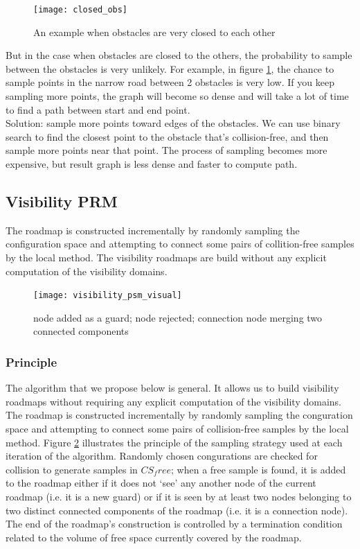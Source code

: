 \documentclass[11pt]{article}
\begin{document}
\begin{figure}
\texttt{[image: closed\_obs]}
\centering
\caption{An example when obstacles are very closed to each other}
\label{fig:closed_obs}
\end{figure}

But in the case when obstacles are closed to the others, the probability to sample between the obstacles is very unlikely. For example, in figure \ref{fig:closed_obs}, the chance to sample points in the narrow road between 2 obstacles is very low. If you keep sampling more points, the graph will become so dense and will take a lot of time to find a path between start and end point.\\
Solution: sample more points toward edges of the obstacles. We can use binary search to find the closest point to the obstacle that's collision-free, and then sample more points near that point. The process of sampling becomes more expensive, but result graph is less dense and faster to compute path.

\subsection{Visibility PRM}
The roadmap is constructed incrementally by randomly sampling the configuration space and attempting to connect some pairs of collition-free samples by the local method.
The visibility roadmaps are build without any explicit computation of the visibility domains.
\begin{figure}[h]
\texttt{[image: visibility\_psm\_visual]}
\centering
\caption{node added as a guard; node rejected; connection node merging two connected components}
\label{fig:vispsm_visual}
\end{figure}

\subsubsection{Principle}
The algorithm that we propose below is general. It allows us to build visibility
roadmaps without requiring any explicit computation of the visibility domains.
The roadmap is constructed incrementally by randomly sampling the conguration
space and attempting to connect some pairs of collision-free samples by the
local method. Figure \ref{fig:vispsm_visual} illustrates the principle of the sampling strategy used at
each iteration of the algorithm. Randomly chosen congurations are checked for
collision to generate samples in $CS_free$; when a free sample is found, it is added to
the roadmap either if it does not ‘see’ any another node of the current roadmap (i.e.
it is a new guard) or if it is seen by at least two nodes belonging to two distinct
connected components of the roadmap (i.e. it is a connection node). The end of
the roadmap’s construction is controlled by a termination condition related to the
volume of free space currently covered by the roadmap.
\end{document}
